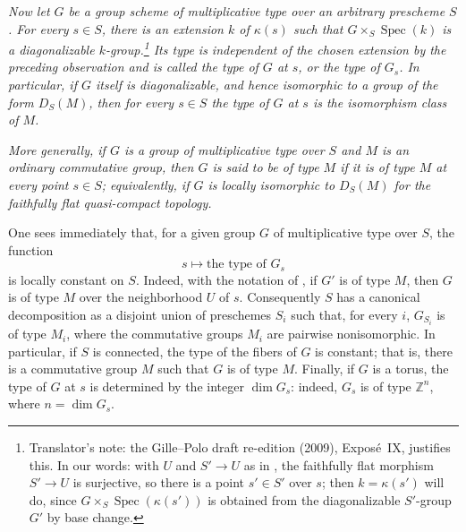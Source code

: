 \textit{Now let \(G\) be a group scheme of multiplicative type over an
arbitrary prescheme \(S\). For every \(s\in S\), there is an extension
\(k\) of \(\kappa(s)\) such that
\(G\times_S\operatorname{Spec}(k)\) is a diagonalizable
\(k\)-group.\footnote{Translator's note: the Gille--Polo draft re-edition (2009), Exposé~IX, justifies this. In our words: with \(U\) and \(S'\to U\) as in , the faithfully flat morphism \(S'\to U\) is surjective, so there is a point \(s'\in S'\) over \(s\); then \(k=\kappa(s')\) will do, since \(G\times_S\operatorname{Spec}(\kappa(s'))\) is obtained from the diagonalizable \(S'\)-group \(G'\) by base change.}
Its type is independent of the chosen extension by the preceding
observation and is called the \emph{type of \(G\) at \(s\)}, or the
\emph{type of \(G_s\)}. In particular, if \(G\) itself is diagonalizable,
and hence isomorphic to a group of the form \(D_S(M)\), then for every
\(s\in S\) the type of \(G\) at \(s\) is the isomorphism class of \(M\).}

\textit{More generally, if \(G\) is a group of multiplicative type over
\(S\) and \(M\) is an ordinary commutative group, then \(G\) is said to
be \emph{of type \(M\)} if it is of type \(M\) at every point \(s\in S\);
equivalently, if \(G\) is locally isomorphic to \(D_S(M)\) for the
faithfully flat quasi-compact topology.}

One sees immediately that, for a given group \(G\) of multiplicative
type over \(S\), the function
\[
  s\longmapsto \text{the type of }G_s
\]
is locally constant on \(S\). Indeed, with the notation of
, if \(G'\) is of type \(M\),
then \(G\) is of type \(M\) over the neighborhood \(U\) of \(s\).
Consequently \(S\) has a canonical decomposition as a disjoint union of
preschemes \(S_i\) such that, for every \(i\), \(G_{S_i}\) is of type
\(M_i\), where the commutative groups \(M_i\) are pairwise
nonisomorphic. In particular, if \(S\) is connected, the type of the fibers
of \(G\) is constant; that is, there is a commutative group \(M\) such
that \(G\) is of type \(M\). Finally, if \(G\) is a torus, the type of
\(G\) at \(s\) is determined by the integer \(\dim G_s\): indeed,
\(G_s\) is of type \(\mathbb Z^n\), where \(n=\dim G_s\).

